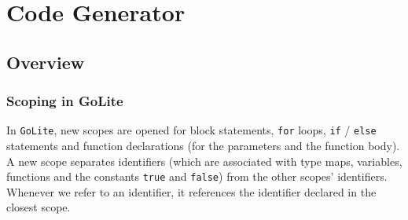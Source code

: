 \documentclass[11pt]{article}
\begin{document}

\section{Code Generator}
\subsection{Overview}
\subsubsection{Scoping in GoLite}
In \texttt{GoLite}, new scopes are opened for block statements, \texttt{for}
loops, \texttt{if} / \texttt{else} statements and function declarations (for the
parameters and the function body). A new scope separates
identifiers (which are associated with type maps, variables,
functions and the constants \texttt{true} and \texttt{false}) from the other
scopes' identifiers. Whenever we refer to an identifier, it
references the identifier declared in the closest scope.
\end{document}
